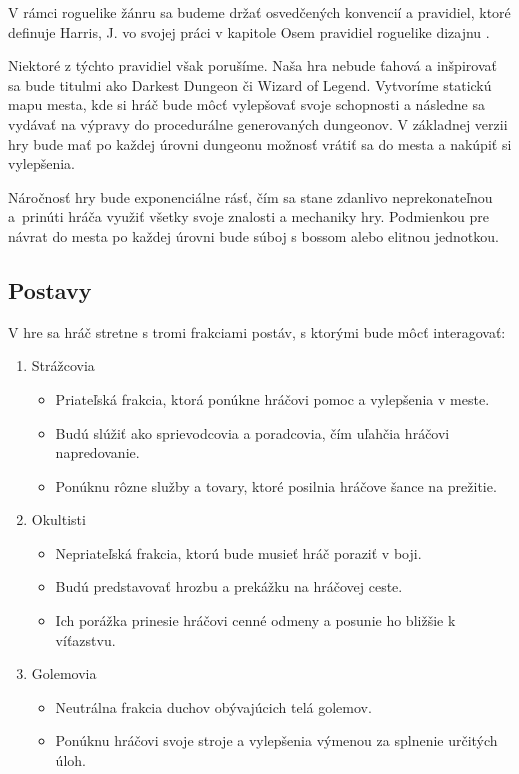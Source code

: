 V rámci roguelike žánru sa budeme držať osvedčených konvencií a pravidiel, ktoré definuje Harris, J. vo svojej práci v kapitole Osem pravidiel roguelike dizajnu \cite{harris2020exploring}.

Niektoré z týchto pravidiel však porušíme. Naša hra nebude ťahová a inšpirovať sa bude titulmi ako Darkest Dungeon či Wizard of Legend. Vytvoríme statickú mapu mesta, kde si hráč bude môcť vylepšovať svoje schopnosti a následne sa vydávať na výpravy do procedurálne generovaných dungeonov. V základnej verzii hry bude mať po každej úrovni dungeonu možnosť vrátiť sa do mesta a nakúpiť si vylepšenia.

Náročnosť hry bude exponenciálne rásť, čím sa stane zdanlivo neprekonateľnou a~prinúti hráča využiť všetky svoje znalosti a mechaniky hry. Podmienkou pre návrat do mesta po každej úrovni bude súboj s bossom alebo elitnou jednotkou.

\subsection{Postavy}

V hre sa hráč stretne s tromi frakciami postáv, s ktorými bude môcť interagovať:

\begin{enumerate}
    \item Strážcovia
    \begin{itemize}
        \item Priateľská frakcia, ktorá ponúkne hráčovi pomoc a vylepšenia v meste.
        \item Budú slúžiť ako sprievodcovia a poradcovia, čím uľahčia hráčovi napredovanie.
        \item Ponúknu rôzne služby a tovary, ktoré posilnia hráčove šance na prežitie.
    \end{itemize}

    \item Okultisti
    \begin{itemize}
        \item Nepriateľská frakcia, ktorú bude musieť hráč poraziť v boji.
        \item Budú predstavovať hrozbu a prekážku na hráčovej ceste.
        \item Ich porážka prinesie hráčovi cenné odmeny a posunie ho bližšie k víťazstvu.
    \end{itemize}

    \item Golemovia
    \begin{itemize}
        \item Neutrálna frakcia duchov obývajúcich telá golemov.
        \item Ponúknu hráčovi svoje stroje a vylepšenia výmenou za splnenie určitých úloh.
    \end{itemize}
\end{enumerate}

